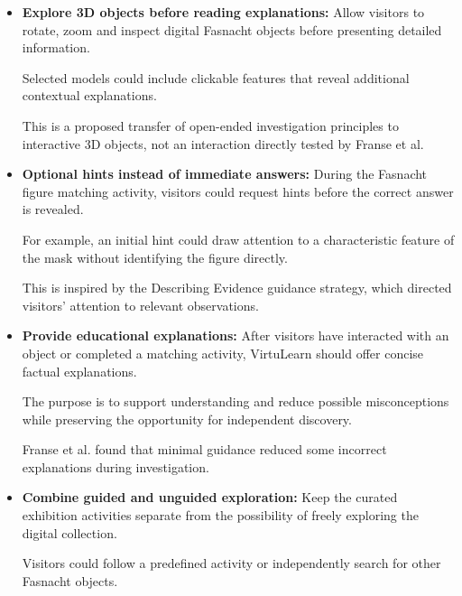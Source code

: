 \begin{itemize}
    This is a proposed application of Whittaker's concept
    of preparing audiences before entering an immersive
    experience.
    \cite[pp.~95--96]{whittaker_onboarding_2025}

    \item \textbf{Explore 3D objects before reading explanations:}
    Allow visitors to rotate, zoom and inspect digital
    Fasnacht objects before presenting detailed information.

    Selected models could include clickable features that
    reveal additional contextual explanations.

    This is a proposed transfer of open-ended
    investigation principles to interactive 3D objects,
    not an interaction directly tested by Franse et al.
    \cite[pp.~708,~721--723]{franse_families_2021}

    \item \textbf{Optional hints instead of immediate answers:}
    During the Fasnacht figure matching activity,
    visitors could request hints before the correct
    answer is revealed.

    For example, an initial hint could draw attention
    to a characteristic feature of the mask without
    identifying the figure directly.

    This is inspired by the Describing Evidence
    guidance strategy, which directed visitors'
    attention to relevant observations.
    \cite[pp.~714,~733--734]{franse_families_2021}

    \item \textbf{Provide educational explanations:}
    After visitors have interacted with an object
    or completed a matching activity, VirtuLearn
    should offer concise factual explanations.

    The purpose is to support understanding and
    reduce possible misconceptions while preserving
    the opportunity for independent discovery.

    Franse et al. found that minimal guidance reduced
    some incorrect explanations during investigation.
    \cite[pp.~727,~733--734]{franse_families_2021}

    \item \textbf{Combine guided and unguided exploration:}
    Keep the curated exhibition activities separate
    from the possibility of freely exploring the
    digital collection.

    Visitors could follow a predefined activity
    or independently search for other Fasnacht objects.


\end{itemize}
